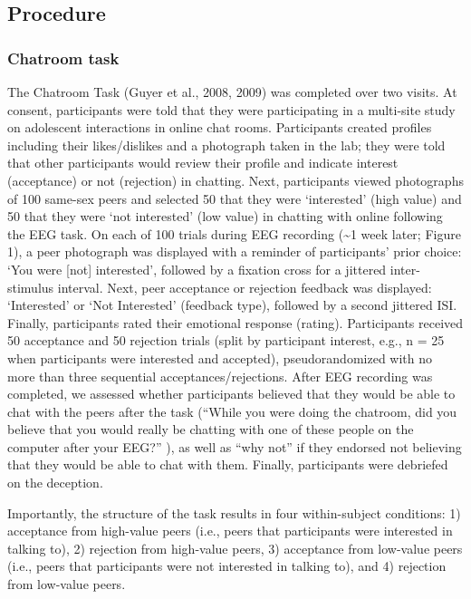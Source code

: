 \documentclass[
  man]{apa7}
\begin{document}
\hypertarget{procedure}{%
\subsection{Procedure}\label{procedure}}

\hypertarget{chatroom-task}{%
\subsubsection{Chatroom task}\label{chatroom-task}}

The Chatroom Task (Guyer et al., 2008, 2009) was completed over two visits. At consent, participants were told that they were participating in a multi-site study on adolescent interactions in online chat rooms. Participants created profiles including their likes/dislikes and a photograph taken in the lab; they were told that other participants would review their profile and indicate interest (acceptance) or not (rejection) in chatting. Next, participants viewed photographs of 100 same-sex peers and selected 50 that they were `interested' (high value) and 50 that they were `not interested' (low value) in chatting with online following the EEG task. On each of 100 trials during EEG recording (\textasciitilde1 week later; Figure 1), a peer photograph was displayed with a reminder of participants' prior choice: `You were {[}not{]} interested', followed by a fixation cross for a jittered inter-stimulus interval. Next, peer acceptance or rejection feedback was displayed: `Interested' or `Not Interested' (feedback type), followed by a second jittered ISI. Finally, participants rated their emotional response (rating). Participants received 50 acceptance and 50 rejection trials (split by participant interest, e.g., n = 25 when participants were interested and accepted), pseudorandomized with no more than three sequential acceptances/rejections. After EEG recording was completed, we assessed whether participants believed that they would be able to chat with the peers after the task (``While you were doing the chatroom, did you believe that you would really be chatting with one of these people on the computer after your EEG?'' ), as well as ``why not'' if they endorsed not believing that they would be able to chat with them. Finally, participants were debriefed on the deception.

Importantly, the structure of the task results in four within-subject conditions: 1) acceptance from high-value peers (i.e., peers that participants were interested in talking to), 2) rejection from high-value peers, 3) acceptance from low-value peers (i.e., peers that participants were not interested in talking to), and 4) rejection from low-value peers.
\end{document}
